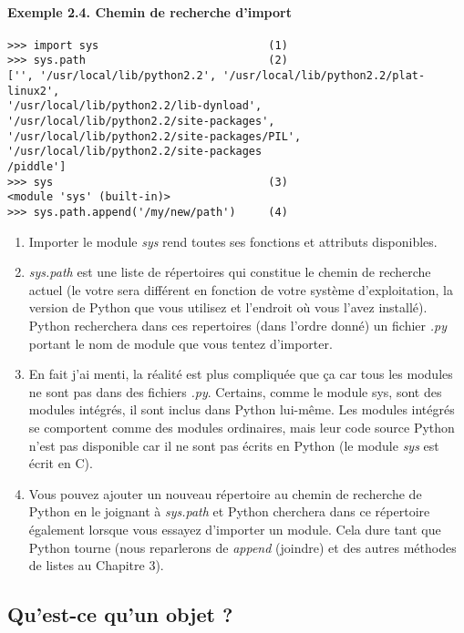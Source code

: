 \paragraph{Exemple 2.4. Chemin de recherche d'import}

\begin{lstlisting}
>>> import sys                          (1)
>>> sys.path                            (2)
['', '/usr/local/lib/python2.2', '/usr/local/lib/python2.2/plat-linux2',
'/usr/local/lib/python2.2/lib-dynload', '/usr/local/lib/python2.2/site-packages',
'/usr/local/lib/python2.2/site-packages/PIL', '/usr/local/lib/python2.2/site-packages
/piddle']
>>> sys                                 (3)
<module 'sys' (built-in)>
>>> sys.path.append('/my/new/path')     (4)
\end{lstlisting}

\begin{enumerate}
\item{Importer le module \emph{sys} rend toutes ses fonctions et attributs disponibles.}
\item{\emph{sys.path} est une liste de répertoires qui constitue le chemin de recherche actuel (le votre sera différent en fonction de votre système d'exploitation, la version de Python que vous utilisez et l'endroit où vous l'avez installé). Python recherchera dans ces repertoires (dans l'ordre donné) un fichier \emph{.py} portant le nom de module que vous tentez d'importer.}
\item{En fait j'ai menti, la réalité est plus compliquée que ça car tous les modules ne sont pas dans des fichiers \emph{.py}. Certains, comme le module sys, sont des modules intégrés, il sont inclus dans Python lui-même. Les modules intégrés se comportent comme des modules ordinaires, mais leur code source Python n'est pas disponible car il ne sont pas écrits en Python (le module \emph{sys} est écrit en C).}
\item{Vous pouvez ajouter un nouveau répertoire au chemin de recherche de Python en le joignant à \emph{sys.path} et Python cherchera dans ce répertoire également lorsque vous essayez d'importer un module. Cela dure tant que Python tourne (nous reparlerons de \emph{append} (joindre) et des autres méthodes de listes au Chapitre 3).}
\end{enumerate}

\subsection{Qu'est-ce qu'un objet ?}

